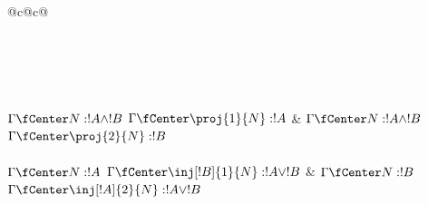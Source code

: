 \documentclass[../../../include/open-logic-section]{subfiles}
\begin{document}
\begin{table}
\begin{tabular}{@{}c@{}c@{}}
\\
\\[3ex]
\\[3ex]
\\[4ex]
\\[4ex]
\\[4ex]
\Axiom$\Gamma \fCenter N: !A \land !B$
\RightLabel{\Elim{\land}[1]}
\UnaryInf$\Gamma \fCenter \proj{1}{N} : !A$
\DisplayProof
&
\Axiom$\Gamma \fCenter N:!A \land !B$
\RightLabel{\Elim{\land}[2]}
\UnaryInf$\Gamma \fCenter \proj{2}{N} : !B$
\DisplayProof\\[3ex]
\\[4ex]
\Axiom$\Gamma \fCenter N: !A$
\RightLabel{\Intro{\lor}[1]}
\UnaryInf$\Gamma \fCenter \inj[!B]{1}{N} : !A \lor !B$
\DisplayProof
&
\Axiom$ \Gamma \fCenter N : !B$
\RightLabel{\Intro{\lor}[2]}
\UnaryInf$\Gamma \fCenter \inj[!A]{2}{N} : !A \lor !B$
\DisplayProof\\[3ex]
\\[4ex]
\end{tabular}
\caption{Règles du système propositionnel intuitionniste
de déduction naturelle étiqueté par des termes .
Les contextes sont des ensembles finis d'affectations de types
à des variables distinctes. La réunion des contextes dans une conclusion est définie
lorsqu'ils attribuent le même type à chaque variable commune.
Les hypothèses inutilisées peuvent rester dans cette réunion.
Les variables déchargées sont choisies distinctes et absentes
du contexte de conclusion, au besoin par renommage préalable.
L'axiome contextualisé permet les hypothèses inutilisées
et la décharge vacuante.}
\end{table}
\end{document}
